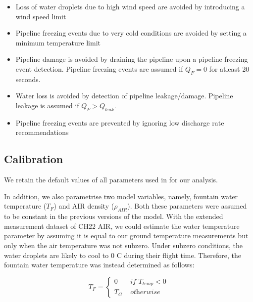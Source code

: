 \documentclass[tc, manuscript]{copernicus}
\begin{document}
\begin{itemize}

\item Loss of water droplets due to high wind speed are avoided by introducing a wind speed limit 

\item Pipeline freezing events due to very cold conditions are avoided by setting a minimum temperature limit 

\item Pipeline damage is avoided by draining the pipeline upon a pipeline freezing event detection. Pipeline
  freezing events are assumed if $Q_F = 0$ for atleast 20 seconds.

\item Water loss is avoided by detection of pipeline leakage/damage. Pipeline leakage is assumed if $Q_F > Q_{leak}$. 

\item Pipeline freezing events are prevented by ignoring low discharge rate recommendations  

\end{itemize}

\subsection{Calibration}
We retain the default values of all parameters used in
\cite{balasubramanianInfluenceMeteorologicalConditions2022} for our analysis.  

In addition, we also parametrise two model variables, namely, fountain water temperature ($T_F$) and AIR density
($\rho_{AIR}$). Both these parameters were assumed to be constant in the previous versions of the model. With
the extended measurement dataset of CH22 AIR, we could estimate the water temperature parameter by assuming it
is equal to our ground temperature measurements but only when the air temperature was not subzero. Under subzero
conditions, the water droplets are likely to cool to 0 C during their flight time. Therefore, the fountain water
temperature was instead determined as follows:

\begin{equation}
	T_{F} = \left\{ \begin{array}{ll}
		0 & \textit{ if } T_{temp} < 0 \\
		T_{G} & \textit{ otherwise}
	\end{array} \right.
\end{equation}
\end{document}
